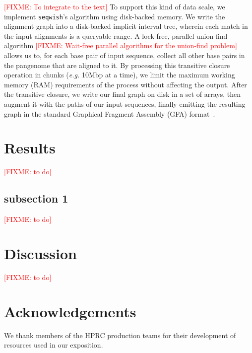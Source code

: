 \documentclass{bioinfo}
\newcommand{\red}[1]{{\textcolor{Red}{#1}}}
\newcommand{\FIXME}[1]{\red{[FIXME: #1]}}
\begin{document}
    \FIXME{To integrate to the text}
    To support this kind of data scale, we implement \texttt{seqwish}'s algorithm using disk-backed memory.
    We write the alignment graph into a disk-backed implicit interval tree, wherein each match in the input alignments is a queryable range.
    A lock-free, parallel union-find algorithm \FIXME{Wait-free parallel algorithms for the union-find problem} allows us to, for each base pair of input sequence, collect all other base pairs in the pangenome that are aligned to it.
    By processing this transitive closure operation in chunks (\textit{e.g.} 10Mbp at a time), we limit the maximum working memory (RAM) requirements of the process without affecting the output.
    After the transitive closure, we write our final graph on disk in a set of arrays, then augment it with the paths of our input sequences,
    finally emitting the resulting graph in the standard Graphical Fragment Assembly (GFA) format~\citep{GFA}.


    \section{Results}
    \label{sec:results}
    \FIXME{to do}


    \subsection{subsection 1}
    \label{subsec:subsec1}
    \FIXME{to do}


    \section{Discussion}
    \label{sec:discussion}
    \FIXME{to do}

    \section*{Acknowledgements}

    We thank members of the HPRC production teams for their development of resources used in our exposition.
\end{document}
